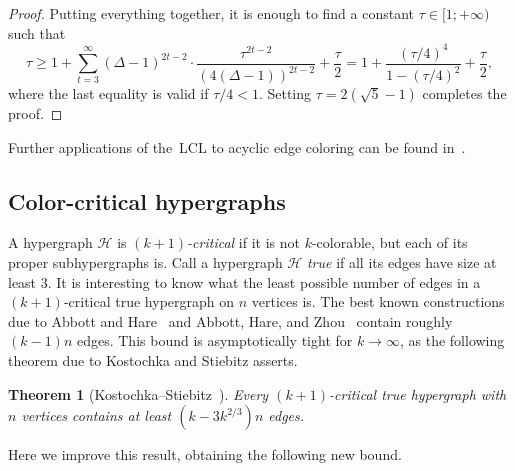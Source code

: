 \documentclass[10pt]{article}
\numberwithin{equation}{subsection}
\newtheorem{theo}{Theorem}[section]
\theoremstyle{definition}
\begin{document}
\begin{proof}
		Putting everything together, it is enough to find a constant $\tau \in [1; +\infty)$ such that
		$$
			\tau \geq 1 + \sum_{t = 3}^\infty (\Delta - 1)^{2t-2} \cdot \frac{\tau^{2t-2}}{(4(\Delta - 1))^{2t-2}} + \frac{\tau}{2} = 1 + \frac{\left(\tau/4\right)^4}{1-\left(\tau/4\right)^2}+\frac{\tau}{2},
		$$
		where the last equality is valid if $\tau/4 < 1$. Setting $\tau = 2(\sqrt{5}-1)$ completes the proof.
	\end{proof}
	
	Further applications of the~LCL to acyclic edge coloring can be found in~\cite{Bernshteyn}.
	
	\subsection{Color-critical hypergraphs}\label{subsec:critical}	
	
	 A hypergraph $\mathcal{H}$ is \emph{$(k+1)$-critical} if it is not $k$-colorable, but each of its proper subhypergraphs is. Call a hypergraph $\mathcal{H}$ \emph{true} if all its edges have size at least $3$. It is interesting to know what the least possible number of edges in a $(k+1)$-critical true hypergraph on $n$ vertices is. The best known constructions due to Abbott and Hare~\cite{Abbott1} and Abbott, Hare, and Zhou~\cite{Abbott2} contain roughly $(k-1)n$ edges. This bound is asymptotically tight for $k \to \infty$, as the following theorem due to Kostochka and Stiebitz asserts.
	 
	 \begin{theo}[Kostochka--Stiebitz~\cite{Kostochka}]\label{theo:Kostochka}
		 	Every $(k+1)$-critical true hypergraph with $n$ vertices contains at least $(k-3k^{2/3})n$ edges.
	 \end{theo}
	 
	 Here we improve this result, obtaining the following new bound.
	 
\end{document}
